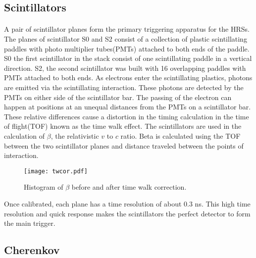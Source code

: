 	\subsection{Scintillators}\label{sec:scin}
	\paragraph{} A pair of scintillator planes form the primary triggering apparatus for the HRSs. The planes of scintillator S0 and S2 consist of a collection of plastic scintillating paddles with photo multiplier tubes(PMTs) attached to both ends of the paddle. S0 the first scintillator in the stack consist of one scintillating paddle in a vertical direction. S2, the second scintillator was built with 16 overlapping paddles with PMTs attached to both ends. As electrons enter the scintillating plastics, photons are emitted via the scintillating interaction. These photons are detected by the PMTs on either side of the scintillator bar. The passing of the electron can happen at positions at an unequal distances from the PMTs on a scintillator bar. These relative differences cause a distortion in the timing calculation in the time of flight(TOF) known as the time walk effect. The scintillators are used in the calculation of $\beta$, the relativistic $v$ to $c$ ratio. Beta is calculated using the TOF between the two scintillator planes and distance traveled between the points of interaction. 
	\begin{figure}[t]
		\centering
		\texttt{[image: twcor.pdf]}
		\caption{Histogram of $\beta$ before and after time walk correction.}
		\label{fig:twcor}
	\end{figure}
	Once calibrated, each plane has a time resolution of about 0.3 ns. This high time resolution and quick response makes the scintillators the perfect detector to form the main trigger.  
	
	\subsection{Cherenkov}\label{sec:Cer}
